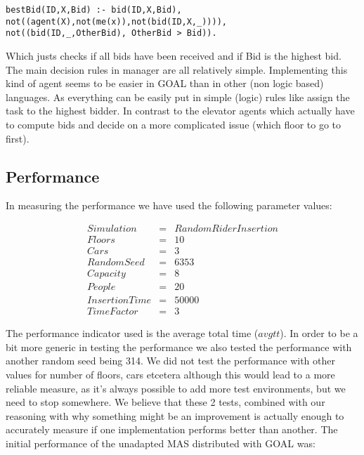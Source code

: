 \documentclass[a4paper,11pt]{article}
\begin{document}
\begin{verbatim}
bestBid(ID,X,Bid) :- bid(ID,X,Bid), not((agent(X),not(me(x)),not(bid(ID,X,_)))), 
not((bid(ID,_,OtherBid), OtherBid > Bid)).
\end{verbatim}
Which justs checks if all bids have been received and if Bid is the highest bid.
\newline\newline
The main decision rules in manager are all relatively simple. Implementing this kind of agent seems to be easier in GOAL than in other (non logic based) languages. As everything can be easily put in simple (logic) rules like assign the task to the highest bidder. In contrast to the elevator agents which actually have to compute bids and decide on a more complicated issue (which floor to go to first). 

\subsection{Performance}
In measuring the performance we have used the following parameter values:

\[\begin{array}{lcl}
Simulation & = & Random Rider Insertion\\
Floors & = & 10\\
Cars & = & 3\\
RandomSeed & = & 6353\\
Capacity & = & 8\\
People & = & 20\\
InsertionTime & = & 50000\\
TimeFactor & = & 3
\end{array}\] 

The performance indicator used is the average total time ($avgtt$). In order to be a bit more generic in testing the performance we also tested the performance with another random seed being 314. We did not test the performance with other values for number of floors, cars etcetera although this would lead to a more reliable measure, as it's always possible to add more test environments, but we need to stop somewhere. We believe that these 2 tests, combined with our reasoning with why something might be an improvement is actually enough to accurately measure if one implementation performs better than another.
\newline\newline
The initial performance of the unadapted MAS distributed with GOAL was:
\end{document}
